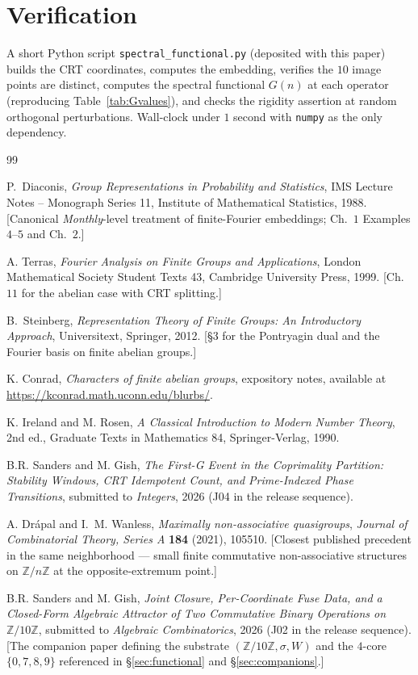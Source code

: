 \documentclass[11pt,reqno]{amsart}
\theoremstyle{definition}
\newcommand{\Z}{\mathbb{Z}}
\begin{document}
\section*{Verification}

A short Python script \texttt{spectral\_functional.py} (deposited
with this paper) builds the CRT coordinates, computes the
embedding, verifies the $10$ image points are distinct, computes
the spectral functional $G(n)$ at each operator (reproducing
Table~\ref{tab:Gvalues}), and checks the rigidity assertion at
random orthogonal perturbations. Wall-clock under $1$ second with
\texttt{numpy} as the only dependency.

\begin{thebibliography}{99}

P.~Diaconis, \emph{Group Representations in Probability and
Statistics}, IMS Lecture Notes -- Monograph Series 11, Institute
of Mathematical Statistics, 1988. [Canonical
\emph{Monthly}-level treatment of finite-Fourier embeddings;
Ch.~$1$ Examples $4$--$5$ and Ch.~$2$.]

A. Terras, \emph{Fourier Analysis on Finite Groups and
Applications}, London Mathematical Society Student Texts 43,
Cambridge University Press, 1999. [Ch.~$11$ for the abelian case
with CRT splitting.]

B.~Steinberg, \emph{Representation Theory of Finite Groups: An
Introductory Approach}, Universitext, Springer, 2012. [\S$3$ for
the Pontryagin dual and the Fourier basis on finite abelian
groups.]

K. Conrad, \emph{Characters of finite abelian groups}, expository
notes, available at \url{https://kconrad.math.uconn.edu/blurbs/}.

K. Ireland and M. Rosen, \emph{A Classical Introduction to Modern
Number Theory}, 2nd ed., Graduate Texts in Mathematics 84,
Springer-Verlag, 1990.

B.R. Sanders and M. Gish, \emph{The First-G Event in the
Coprimality Partition: Stability Windows, CRT Idempotent Count,
and Prime-Indexed Phase Transitions}, submitted to
\emph{Integers}, 2026 (J04 in the release sequence).

A. Drápal and I.~M. Wanless, \emph{Maximally non-associative
quasigroups}, \emph{Journal of Combinatorial Theory, Series A}
\textbf{184} (2021), 105510. [Closest published precedent in the
same neighborhood --- small finite commutative non-associative
structures on $\Z/n\Z$ at the opposite-extremum point.]

B.R. Sanders and M. Gish, \emph{Joint Closure, Per-Coordinate
Fuse Data, and a Closed-Form Algebraic Attractor of Two
Commutative Binary Operations on $\Z/10\Z$}, submitted to
\emph{Algebraic Combinatorics}, 2026 (J02 in the release
sequence). [The companion paper defining the substrate
$(\Z/10\Z, \sigma, W)$ and the $4$-core $\{0, 7, 8, 9\}$
referenced in \S\ref{sec:functional} and \S\ref{sec:companions}.]

\end{thebibliography}
\end{document}
